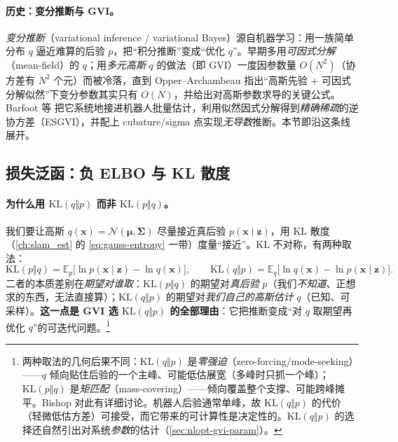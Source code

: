 \paragraph{历史：变分推断与 GVI。}
\emph{变分推断}（variational inference / variational Bayes）源自机器学习\cite{barfoot2024state}：用一族简单分布 $q$ 逼近难算的后验 $p$，把“积分推断”变成“优化 $q$”。早期多用\emph{可因式分解}（mean-field）的 $q$；用\emph{多元高斯} $q$ 的做法（即 GVI）一度因参数量 $O(N^2)$（协方差有 $N^2$ 个元）而被冷落，直到 Opper--Archambeau\cite{opper2009variational} 指出“高斯先验 $+$ 可因式分解似然”下变分参数其实只有 $O(N)$，并给出对高斯参数求导的关键公式。Barfoot 等\cite{barfoot2020esgvi} 把它系统地接进机器人批量估计，利用似然因式分解得到\emph{精确稀疏}的逆协方差（ESGVI），并配上 cubature/sigma 点实现\emph{无导数}推断。本节即沿这条线展开。

\subsection{损失泛函：负 ELBO 与 KL 散度}
\label{sec:nlopt-gvi-elbo}

\paragraph{为什么用 $\mathrm{KL}(q\Vert p)$ 而非 $\mathrm{KL}(p\Vert q)$。}
我们要让高斯 $q(\mathbf{x})=\mathcal{N}(\boldsymbol{\mu},\boldsymbol{\Sigma})$ 尽量接近真后验 $p(\mathbf{x}\mid\mathbf{z})$，用 KL 散度（\cref{ch:slam_est} 的 \cref{eq:gauss-entropy} 一带）度量“接近”。KL 不对称，有两种取法\cite{barfoot2024state}：
\begin{equation}
  \mathrm{KL}(p\Vert q)=\mathbb{E}_p\!\big[\ln p(\mathbf{x}\mid\mathbf{z})-\ln q(\mathbf{x})\big],\qquad
  \mathrm{KL}(q\Vert p)=\mathbb{E}_q\!\big[\ln q(\mathbf{x})-\ln p(\mathbf{x}\mid\mathbf{z})\big].
  \label{eq:gvi-kl-two}
\end{equation}
二者的本质差别在\emph{期望对谁取}：$\mathrm{KL}(p\Vert q)$ 的期望对\emph{真后验} $p$（我们\emph{不知道}、正想求的东西，无法直接算）；$\mathrm{KL}(q\Vert p)$ 的期望对\emph{我们自己的高斯估计} $q$（已知、可采样）。\textbf{这一点是 GVI 选 $\mathrm{KL}(q\Vert p)$ 的全部理由}：它把推断变成“对 $q$ 取期望再优化 $q$”的可迭代问题。\footnote{两种取法的几何后果不同：$\mathrm{KL}(q\Vert p)$ 是\emph{零强迫}（zero-forcing/mode-seeking）——$q$ 倾向贴住后验的一个主峰、可能低估展宽（多峰时只抓一个峰）；$\mathrm{KL}(p\Vert q)$ 是\emph{矩匹配}（mass-covering）——倾向覆盖整个支撑、可能跨峰摊平。Bishop\cite{bishop2006prml} 对此有详细讨论。机器人后验通常单峰，故 $\mathrm{KL}(q\Vert p)$ 的代价（轻微低估方差）可接受，而它带来的可计算性是决定性的。$\mathrm{KL}(q\Vert p)$ 的选择还自然引出对系统\emph{参数}的估计（\cref{sec:nlopt-gvi-param}）。}

